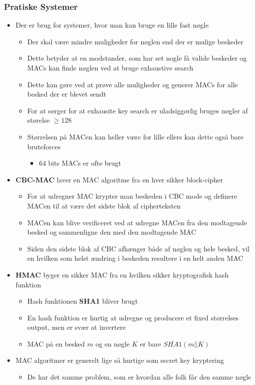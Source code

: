 \documentclass[a4, english]{article}
\begin{document}
\subsubsection{Pratiske Systemer}
\begin{itemize}
	\item Der er brug for systemer, hvor man kan bruge en lille fast nøgle 
  \begin{itemize}
  	\item Der skal være mindre muligheder for nøglen end der er mulige beskeder 
    \item Dette betyder at en modstander, som har set nogle få valide beskeder og MACs kan finde nøglen ved at bruge exhaustive search  
    \item Dette kan gøre ved at prøve alle muligheder og generer MACs for alle besked der er blevet sendt 
    \item For at sørger for at exhausite key search er uladsiggørlig bruges nøgler af størelse $\geq 128$ 
    \item Størrelsen på MACen kan heller være for lille ellers kan dette også bare bruteforces 
    \begin{itemize}
    	\item 64 bits MACs er ofte brugt
    \end{itemize}
  \end{itemize}
  \item \textbf{CBC-MAC} laver en MAC algoritme fra en hver sikker block-cipher 
  \begin{itemize}
  	\item For at udregner MAC krypter man beskeden i CBC mode og definere MACen til at være det sidste blok af cipherteksten
    \item MACen kan blive verificeret ved at udregne MACen fra den modtagende besked og sammenligne den med den modtagende MAC
    \item Siden den sidste blok af CBC afhænger både af nøglen og hele besked, vil en hvilken som helst ændring i beskeden resultere i en helt anden MAC 
  \end{itemize}
  \item \textbf{HMAC} byger en sikker MAC fra en hvilken sikker kryptografisk hash funktion
  \begin{itemize}
  	\item Hash funktionen \textbf{SHA1} bliver brugt
    \item En hash funktion er hurtig at udregne og producere et fixed størrelses output, men er svær at invertere 
    \item MAC på en besked $m$ og en nøgle $K$ er bare $SHA1(m || K)$ 
  \end{itemize}
  \item MAC algoritmer er generelt lige så hurtige som secret key kryptering
  \begin{itemize}
  	\item De har det samme problem, som er hvordan alle folk får den samme nøgle
  \end{itemize}
\end{itemize}
\end{document}
